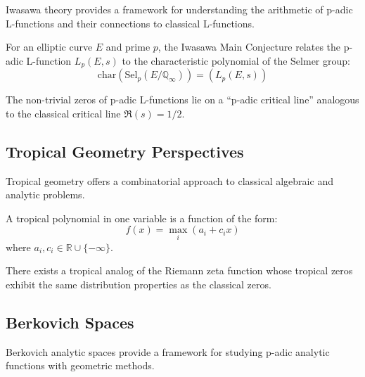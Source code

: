 Iwasawa theory provides a framework for understanding the arithmetic of p-adic L-functions and their connections to classical L-functions.

\begin{definition}
\label{def:iwasawa_main}
For an elliptic curve $E$ and prime $p$, the Iwasawa Main Conjecture relates the p-adic L-function $L_p(E,s)$ to the characteristic polynomial of the Selmer group:
\begin{equation}
\text{char}(\text{Sel}_p(E/\mathbb{Q}_{\infty})) = (L_p(E,s))
\label{eq:iwasawa_main}
\end{equation}
\end{definition}

\begin{conjecture}
\label{conj:padic_rh}
The non-trivial zeros of p-adic L-functions lie on a ``p-adic critical line'' analogous to the classical critical line $\Re(s) = 1/2$.
\end{conjecture}

\subsection{Tropical Geometry Perspectives}

Tropical geometry offers a combinatorial approach to classical algebraic and analytic problems.

\begin{definition}
\label{def:tropical_polynomial}
A tropical polynomial in one variable is a function of the form:
\begin{equation}
f(x) = \max_{i} (a_i + c_i x)
\label{eq:tropical_polynomial}
\end{equation}
where $a_i, c_i \in \mathbb{R} \cup \{-\infty\}$.
\end{definition}

\begin{conjecture}
\label{conj:tropical_rh}
There exists a tropical analog of the Riemann zeta function whose tropical zeros exhibit the same distribution properties as the classical zeros.
\end{conjecture}

\subsection{Berkovich Spaces}

Berkovich analytic spaces provide a framework for studying p-adic analytic functions with geometric methods.

